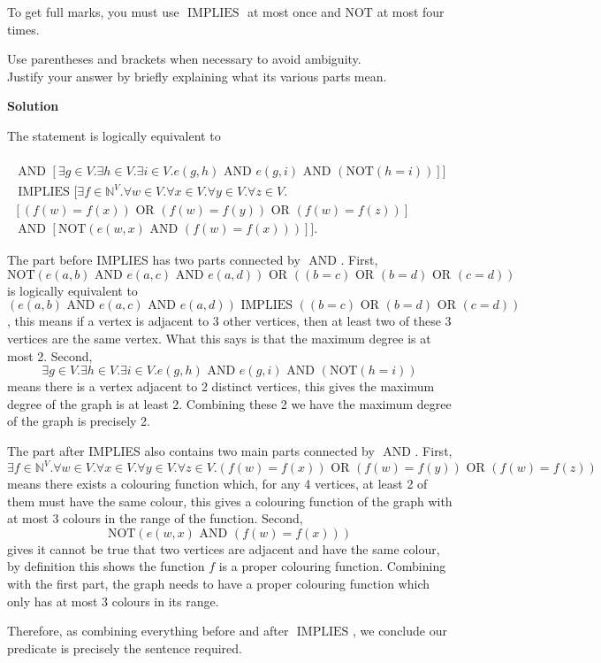 \documentclass[12pt]{article}
\newcommand{\nnot}{\mathrm{NOT}}
\newcommand{\aand}{\,\,\mathrm{AND}\,\,}
\newcommand{\oor}{\,\,\mathrm{OR}\,\,}
\newcommand{\iimplies}{\,\,\mathrm{IMPLIES}\,\,}
\newcommand{\nats}{\mathbb{N}}
\begin{document}
\begin{enumerate}
To get full marks, you must use $\iimplies$ at most once and $\nnot$ at most four times.

Use parentheses and brackets when necessary to avoid ambiguity.\\
Justify your answer  by briefly explaining what its various parts mean.

\vspace{.25in}\textbf{Solution}\vspace{.10in}

The statement is logically equivalent to 

\begin{multline*}
    [[\forall a\in V.\forall b\in V.\forall c\in V.\forall d\in V.\\
    \nnot(e(a,b)\aand e(a,c)\aand e(a,d))\oor((b=c)\oor(b=d)\oor(c=d))]\\
    \aand[\exists g\in V.\exists h\in V. \exists i\in V. e(g,h)\aand e(g,i)\aand (\nnot(h=i))]]\\
    \iimplies[\exists f\in\nats^V.\forall w\in V.\forall x\in V.\forall y\in V.\forall z\in V.\\
    [(f(w)=f(x))\oor(f(w)=f(y))\oor(f(w)=f(z))] \\
    \aand [\nnot(e(w,x)\aand(f(w)=f(x)))]].
\end{multline*} 

The part before IMPLIES has two parts connected by $\aand$. First, $$\nnot(e(a,b)\aand e(a,c)\aand e(a,d))\oor((b=c)\oor(b=d)\oor(c=d))$$ is logically equivalent to $$(e(a,b)\aand e(a,c)\aand e(a,d))\iimplies((b=c)\oor(b=d)\oor(c=d))$$, this means if a vertex is adjacent to 3 other vertices, then at least two of these 3 vertices are the same vertex. What this says is that the maximum degree is at most 2. Second, $$\exists g\in V.\exists h\in V. \exists i\in V. e(g,h)\aand e(g,i)\aand (\nnot(h=i))$$ means there is a vertex adjacent to 2 distinct vertices, this gives the maximum degree of the graph is at least 2. Combining these 2 we have the maximum degree of the graph is precisely 2.

The part after IMPLIES also contains two main parts connected by $\aand$. First, $$\exists f\in\nats^V.\forall w\in V.\forall x\in V.\forall y\in V.\forall z\in V.(f(w)=f(x))\oor(f(w)=f(y))\oor(f(w)=f(z))$$ means there exists a colouring function which, for any 4 vertices, at least 2 of them must have the same colour, this gives a colouring function of the graph with at most 3 colours in the range of the function. Second,  $$\nnot(e(w,x)\aand(f(w)=f(x)))$$ gives it cannot be true that two vertices are adjacent and have the same colour, by definition this shows the function $f$ is a proper colouring function. Combining with the first part, the graph needs to have a proper colouring function which only has at most 3 colours in its range.

Therefore, as combining everything before and after $\iimplies$, we conclude our predicate is precisely the sentence required.

\end{enumerate}
\end{document}
